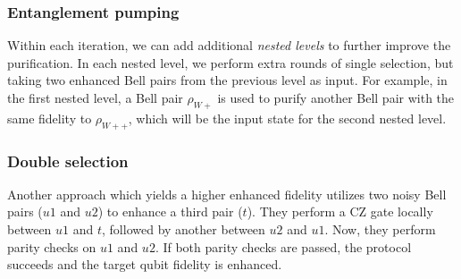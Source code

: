 \begin{center}
\end{center}


\subsubsection*{Entanglement pumping}
Within each iteration, we can add additional \emph{nested levels} to further improve the purification. In each nested level, we perform extra rounds of single selection, but taking two enhanced Bell pairs from the previous level as input. For example, in the first nested level, a Bell pair $\rho_{W+}$ is used to purify another Bell pair with the same fidelity to $\rho_{W++}$, which will be the input state for the second nested level.

\subsubsection*{Double selection}
Another approach which yields a higher enhanced fidelity utilizes two noisy Bell pairs ($u1$ and $u2$) to enhance a third pair ($t$). They perform a CZ gate locally between $u1$ and $t$, followed by another between $u2$ and $u1$. Now, they perform parity checks on $u1$ and $u2$. If both parity checks are passed, the protocol succeeds and the target qubit fidelity is enhanced.

